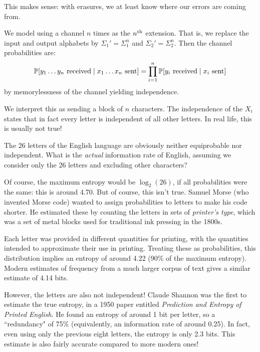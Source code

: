 \documentclass{article}
\begin{document}
\begin{note}
	This makes sense:
	with erasures, we at least know where our errors are coming from.
\end{note}

\begin{definition}
    We model using a channel $n$ times as the $n\th$ extension.
    That is, we replace the input and output alphabets by
    $\Sigma_1' = \Sigma_1^n$ and $\Sigma_2' = \Sigma_2^n$.
    Then the channel probabilities are:
    \[
	\P[y_1 \dots y_n \text{ received} \mid x_1 \dots x_n \text{ sent}] =
	\prod_{i=1}^n  \P[y_i \text{ received} \mid x_i \text{ sent}]
	\]
	by memorylessness of the channel yielding independence.
\end{definition}

\begin{note}
	We interpret this as sending a block of $n$ characters.
	The independence of the $X_i$ states that in fact
	every letter is independent of all other letters.
	In real life, this is usually not true!
\end{note}

\begin{remark}
	\label{remark-on-english-language-entropy}
    The 26 letters of the English language are obviously neither equiprobable nor independent. What is the \textit{actual} information rate of English, assuming we consider only the 26 letters and excluding other characters?

	Of course, the maximum entropy would be $\log_2(26)$, if all probabilities were the same: this is around 4.70. But of course, this isn't true. Samuel Morse (who invented Morse code) wanted to assign probabilities to letters to make his code shorter. He estimated these by counting the letters in sets of \textit{printer's type}, which was a set of metal blocks used for traditional ink pressing in the 1800s.
	
	Each letter was provided in different quantities for printing, with the quantities intended to approximate their use in printing. Treating these as probabilities, this distribution implies an entropy of around 4.22 (90\% of the maximum entropy). Modern estimates of frequency from a much larger corpus of text gives a similar estimate of 4.14 bits.

	However, the letters are also not independent! Claude Shannon was the first to estimate the true entropy, in a 1950 paper entitled \textit{Prediction and Entropy of Printed English}. He found an entropy of around 1 bit per letter, so a ``redundancy" of 75\% (equivalently, an information rate of around 0.25). In fact, even using only the previous eight letters, the entropy is only 2.3 bits. This estimate is also fairly accurate compared to more modern ones!
\end{remark}
\end{document}
